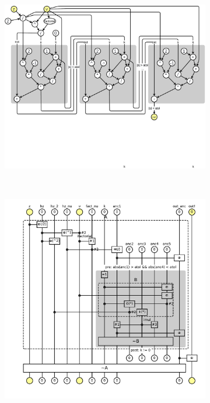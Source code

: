 \documentclass{article}
\newcommand{\<}{\langle}
\renewcommand{\>}{\rangle}
\theoremstyle{definition}\newtheorem{definition}{\textit{Definition}}
\begin{document}
\begin{figure}[t!]
    \centering
    \begin{subfigure}[t]{0.52\textwidth}
        \centering
        \includegraphics[width=\textwidth,trim={0 4cm 0 0cm},clip]{computational_graph.pdf}
        \caption{}
    \end{subfigure}%
    ~
    \begin{subfigure}[t]{0.47\textwidth}
        \centering
        \includegraphics[width=\textwidth,trim={0 1cm 0 0cm},clip]{fig4.pdf}

\end{subfigure}
\end{figure}
\end{document}
